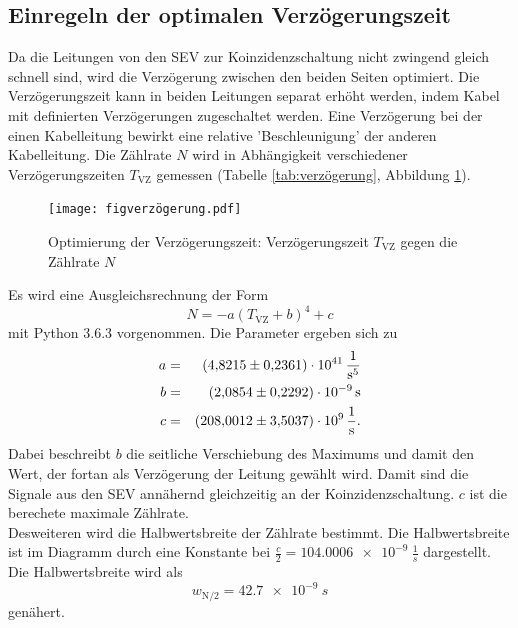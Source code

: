 \subsection{Einregeln der optimalen Verzögerungszeit}
Da die Leitungen von den SEV zur Koinzidenzschaltung nicht zwingend gleich schnell sind, wird die Verzögerung zwischen den beiden Seiten optimiert.
Die Verzögerungszeit kann in beiden Leitungen separat erhöht werden, indem Kabel mit definierten Verzögerungen zugeschaltet werden.
Eine Verzögerung bei der einen Kabelleitung bewirkt eine relative 'Beschleunigung' der anderen Kabelleitung.
Die Zählrate $N$ wird in Abhängigkeit verschiedener Verzögerungszeiten $T_{\text{VZ}}$ gemessen (Tabelle \ref{tab:verzögerung}, Abbildung \ref{fig:verzögerung}).

\begin{figure}[h!]
  \centering
  \texttt{[image: figverzögerung.pdf]}
  \caption{Optimierung der Verzögerungszeit: Verzögerungszeit $T_{\text{VZ}}$ gegen die Zählrate $N$}
  \label{fig:verzögerung}
\end{figure}
Es wird eine Ausgleichsrechnung der Form
\begin{equation*}
  N = -a \left( T_{\text{VZ}} +b \right)^4+c
\end{equation*}
mit Python 3.6.3 vorgenommen.
Die Parameter ergeben sich zu
\begin{align*}
  a &=& \SI{  4.8215 \pm 0.2361 e41}{\frac{1}{s^5}}\\
  b &=& \SI{  2.0854 \pm 0.2292 e-9}{s}\\
  c &=& \SI{208.0012 \pm 3.5037 e9}{\frac{1}{s}}.\\
\end{align*}
Dabei beschreibt $b$ die seitliche Verschiebung des Maximums und damit den Wert, der fortan als Verzögerung der Leitung gewählt wird.
Damit sind die Signale aus den SEV annähernd gleichzeitig an der Koinzidenzschaltung. $c$ ist die berechete maximale Zählrate.\\
Desweiteren wird die Halbwertsbreite der Zählrate bestimmt.
Die Halbwertsbreite ist im Diagramm durch eine Konstante bei $\frac{c}{2}=\SI{104.0006 e-9}{\frac{1}{s}}$ dargestellt.
Die Halbwertsbreite wird als
\begin{equation*}
  w_{\text{N/2}}= \SI{42.7e-9}{s}
\end{equation*}
genähert.
\FloatBarrier
